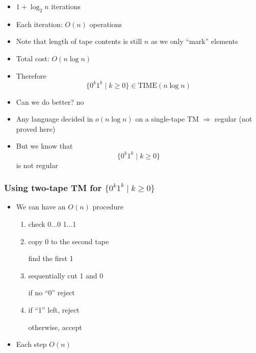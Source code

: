 \begin{frame}[allowframebreaks]
\begin{itemize}
\item [] $1+\log_2 n$ iterations

\item Each iteration: $O(n)$ operations
\item [] Note that length of tape contents is still $n$ as we only ``mark'' elements
\item Total cost: $O(n \log n)$

\item Therefore
  \begin{equation*}
\{0^k 1^k\mid k \geq 0\} \in \text{TIME}(n \log n)
\end{equation*}
\item Can we do better? no

\item Any language decided in $o(n\log n)$
on a single-tape TM $\Rightarrow$ regular
(not proved here)
\item But we know that
  \begin{equation*}
  \{0^k1^k \mid k \geq 0\}
\end{equation*}
is not regular

\end{itemize}\end{frame} \begin{frame}[allowframebreaks] \frametitle{Using two-tape TM for $ \{0^k1^k \mid k \geq 0\}$}
  \begin{itemize}
\item We can have an $O(n)$ procedure
  \begin{enumerate}
  \item check 0...0 1...1

  \item copy 0 to the second tape

find the first 1
\item sequentially cut 1 and 0

if no ``0'' reject
\item if ``1'' left, reject

otherwise, accept
  \end{enumerate}

\item Each step $O(n)$

\end{itemize}\end{frame} 


